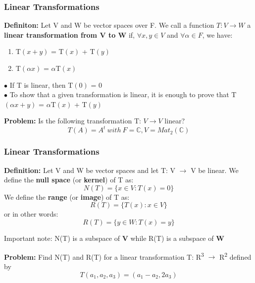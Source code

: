 \documentclass[11pt]{beamer}
\begin{document}
\begin{frame}
	\frametitle{Linear Transformations}
	\textbf{Definiton:} Let V and W be vector spaces over F. We call a function $T: V \rightarrow W $ a \textbf{linear transformation from V to W} if, $\forall x,y \in V$ and $\forall \alpha \in F$, we have:
	\begin{enumerate}
		[default]
		\item T$(x + y)$ = T$(x)$ + T$(y)$
		\item T$(\alpha x)$ = $\alpha$T$(x)$
	\end{enumerate}
\phantom{}


$\bullet$ If T is linear, then T$(0)$ = $0$ \\
$\bullet$ To show that a given transformation is linear, it is enough to prove that T$(\alpha x + y)$ = $\alpha$T$(x)$ + T$(y)$

\phantom{}

\textbf{Problem:} Is the following transformation T: $V \rightarrow V$  linear?
\[  T(A) = A^{t} \ with \ F = \mathbb{C}, V = Mat_{2}(\mathbb{C}) \]
\end{frame}

\begin{frame}
	\frametitle{Linear Transformations}
	\textbf{Definition:} Let V and W be vector spaces and let T: V $\rightarrow$ V be linear. We define the \textbf{null space} (or \textbf{kernel}) of T as:
	\[ N(T) = \{x \in V: T(x) = 0 \}\]
	We define the \textbf{range} (or \textbf{image}) of T as:
	\[ R(T) = \{T(x) : x \in V \}\]
	or in other words:
	\[ R(T) = \{y \in W : T(x) = y \}\]	
	
Important note: N(T) is a subspace of \textbf{V} while R(T) is a subspace of \textbf{W}

\phantom{}

\textbf{Problem:} Find N(T) and R(T) for a linear transformation T: R\textsuperscript{3} $\rightarrow$ R\textsuperscript{2} defined by
\[T(a_{1}, a_{2}, a_{3}) = (a_{1} - a_{2}, 2 a_3) \]
\end{frame}
\end{document}
